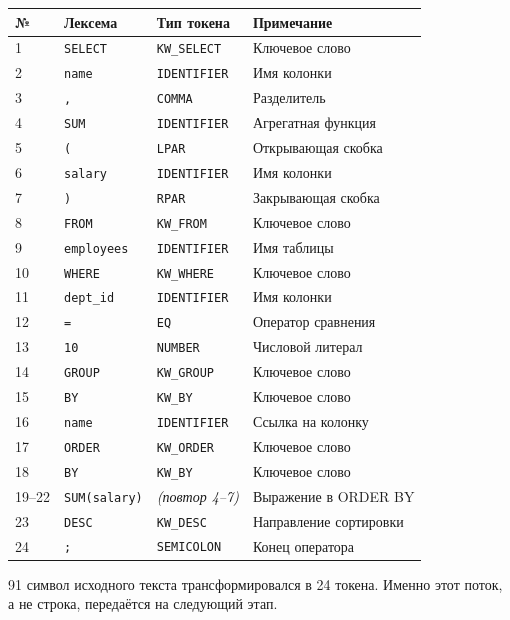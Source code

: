 \documentclass[a4paper,12pt]{report}
\begin{document}
\begin{longtable}{|l|l|l|l|}
\hline
№ & Лексема & Тип токена & Примечание \\ \hline
1 & \texttt{SELECT} & \texttt{KW\_SELECT} & Ключевое слово \\ \hline
2 & \texttt{name} & \texttt{IDENTIFIER} & Имя колонки \\ \hline
3 & \texttt{,} & \texttt{COMMA} & Разделитель \\ \hline
4 & \texttt{SUM} & \texttt{IDENTIFIER} & Агрегатная функция \\ \hline
5 & \texttt{(} & \texttt{LPAR} & Открывающая скобка \\ \hline
6 & \texttt{salary} & \texttt{IDENTIFIER} & Имя колонки \\ \hline
7 & \texttt{)} & \texttt{RPAR} & Закрывающая скобка \\ \hline
8 & \texttt{FROM} & \texttt{KW\_FROM} & Ключевое слово \\ \hline
9 & \texttt{employees} & \texttt{IDENTIFIER} & Имя таблицы \\ \hline
10 & \texttt{WHERE} & \texttt{KW\_WHERE} & Ключевое слово \\ \hline
11 & \texttt{dept\_id} & \texttt{IDENTIFIER} & Имя колонки \\ \hline
12 & \texttt{=} & \texttt{EQ} & Оператор сравнения \\ \hline
13 & \texttt{10} & \texttt{NUMBER} & Числовой литерал \\ \hline
14 & \texttt{GROUP} & \texttt{KW\_GROUP} & Ключевое слово \\ \hline
15 & \texttt{BY} & \texttt{KW\_BY} & Ключевое слово \\ \hline
16 & \texttt{name} & \texttt{IDENTIFIER} & Ссылка на колонку \\ \hline
17 & \texttt{ORDER} & \texttt{KW\_ORDER} & Ключевое слово \\ \hline
18 & \texttt{BY} & \texttt{KW\_BY} & Ключевое слово \\ \hline
19–22 & \texttt{SUM(salary)} & \textit{(повтор 4–7)} & Выражение в ORDER BY \\ \hline
23 & \texttt{DESC} & \texttt{KW\_DESC} & Направление сортировки \\ \hline
24 & \texttt{;} & \texttt{SEMICOLON} & Конец оператора \\ \hline
\end{longtable}

91 символ исходного текста трансформировался в 24 токена. Именно этот поток, а не строка, передаётся на следующий этап.
\end{document}
